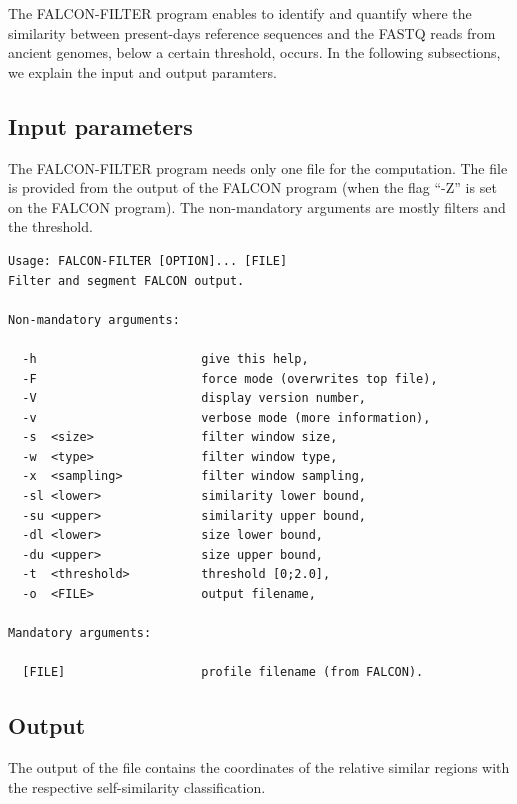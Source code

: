 \documentclass[11pt,journal,compsoc]{report}[1]
\begin{document}
The FALCON-FILTER program enables to identify and quantify where the 
similarity between present-days reference sequences and the FASTQ reads 
from ancient genomes, below a certain threshold, occurs.
In the following subsections, we explain the input and output paramters.

\subsection*{Input parameters}

The FALCON-FILTER program needs only one file for the computation. The
file is provided from the output of the FALCON program (when the flag
``-Z'' is set on the FALCON program). The non-mandatory arguments are
mostly filters and the threshold.
\begin{lstlisting}
Usage: FALCON-FILTER [OPTION]... [FILE]                                  
Filter and segment FALCON output.                                        
                                                                         
Non-mandatory arguments:                                                 
                                                                         
  -h                       give this help,                               
  -F                       force mode (overwrites top file),             
  -V                       display version number,                       
  -v                       verbose mode (more information),              
  -s  <size>               filter window size,                           
  -w  <type>               filter window type,                           
  -x  <sampling>           filter window sampling,                       
  -sl <lower>              similarity lower bound,                       
  -su <upper>              similarity upper bound,                       
  -dl <lower>              size lower bound,                             
  -du <upper>              size upper bound,                             
  -t  <threshold>          threshold [0;2.0],                            
  -o  <FILE>               output filename,                              
                                                                         
Mandatory arguments:                                                     
                                                                         
  [FILE]                   profile filename (from FALCON).
\end{lstlisting}

\subsection*{Output}

The output of the file contains the coordinates of the relative
similar regions with the respective self-similarity classification.



\end{document}
